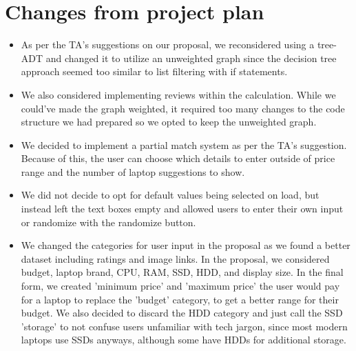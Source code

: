 \documentclass{article}
\begin{document}
\section{Changes from project plan}
\begin{itemize}
    \item As per the TA's suggestions on our proposal, we reconsidered using a tree-ADT and changed it to utilize an unweighted graph since the decision tree approach seemed too similar to list filtering with if statements.
    \item We also considered implementing reviews within the calculation. While we could've made the graph weighted, it required too many changes to the code structure we had prepared so we opted to keep the unweighted graph. 
    \item We decided to implement a partial match system as per the TA's suggestion. Because of this, the user can choose which details to enter outside of price range and the number of laptop suggestions to show.
    \item We did not decide to opt for default values being selected on load, but instead left the text boxes empty and allowed users to enter their own input or randomize with the randomize button.
    \item We changed the categories for user input in the proposal as we found a better dataset including ratings and image links. In the proposal, we considered budget, laptop brand, CPU, RAM, SSD, HDD, and display size. In the final form, we created 'minimum price' and 'maximum price' the user would pay for a laptop to replace the 'budget' category, to get a better range for their budget. We also decided to discard the HDD category and just call the SSD 'storage' to not confuse users unfamiliar with tech jargon, since most modern laptops use SSDs anyways, although some have HDDs for additional storage. 
\end{itemize}
\end{document}
